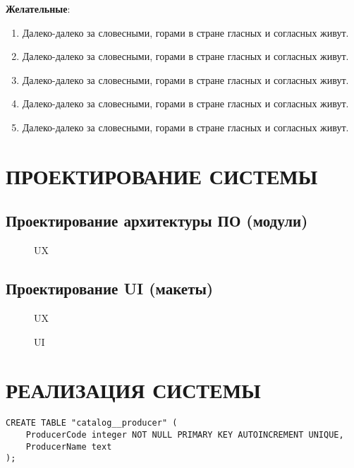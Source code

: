 \documentclass[12pt, a4paper, simple]{eskdtext}
\begin{document}
\textbf{Желательные}:
\begin{enumerate}
    \item Далеко-далеко за словесными, горами в стране гласных и согласных живут.
    \item Далеко-далеко за словесными, горами в стране гласных и согласных живут.
    \item Далеко-далеко за словесными, горами в стране гласных и согласных живут.
    \item Далеко-далеко за словесными, горами в стране гласных и согласных живут.
    \item Далеко-далеко за словесными, горами в стране гласных и согласных живут.
\end{enumerate}


\newpage
\section{ПРОЕКТИРОВАНИЕ СИСТЕМЫ}

\subsection{Проектирование архитектуры ПО (модули)}

\begin{figure}[!h]
    \centering
    \caption{UX}
\end{figure}

\subsection{Проектирование UI (макеты)}

\begin{figure}[!h]
    \centering
    \caption{UX}
\end{figure}

\begin{figure}[!h]
    \centering
    \caption{UI}
\end{figure}

\newpage
\section{РЕАЛИЗАЦИЯ СИСТЕМЫ}

\begin{lstlisting}[name=Справочник "Производители"]
CREATE TABLE "catalog__producer" (
    ProducerCode integer NOT NULL PRIMARY KEY AUTOINCREMENT UNIQUE,
    ProducerName text
);
\end{lstlisting}
\end{document}
